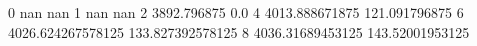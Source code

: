0 nan nan
1 nan nan
2 3892.796875 0.0
4 4013.888671875 121.091796875
6 4026.624267578125 133.827392578125
8 4036.31689453125 143.52001953125
